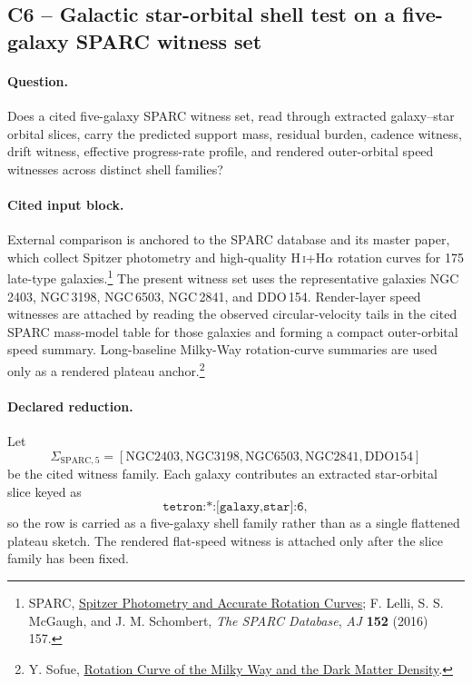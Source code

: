 \subsection{C6 -- Galactic star-orbital shell test on a five-galaxy SPARC witness set}\label{app:c6}
\paragraph{Question.} Does a cited five-galaxy SPARC witness set, read through extracted galaxy--star orbital slices, carry the predicted support mass, residual burden, cadence witness, drift witness, effective progress-rate profile, and rendered outer-orbital speed witnesses across distinct shell families?

\paragraph{Cited input block.} External comparison is anchored to the SPARC database and its master paper, which collect Spitzer photometry and high-quality H\,\textsc{i}+H$\alpha$ rotation curves for 175 late-type galaxies.\footnote{SPARC, \href{https://astroweb.case.edu/SPARC/}{Spitzer Photometry and Accurate Rotation Curves}; F. Lelli, S. S. McGaugh, and J. M. Schombert, \emph{The SPARC Database}, \emph{AJ} \textbf{152} (2016) 157.} The present witness set uses the representative galaxies NGC\,2403, NGC\,3198, NGC\,6503, NGC\,2841, and DDO\,154. Render-layer speed witnesses are attached by reading the observed circular-velocity tails in the cited SPARC mass-model table for those galaxies and forming a compact outer-orbital speed summary. Long-baseline Milky-Way rotation-curve summaries are used only as a rendered plateau anchor.\footnote{Y. Sofue, \href{https://www.ioa.s.u-tokyo.ac.jp/~sofue/papers/sofcomp/2020-galax-RC-DM-MW-Review.pdf}{Rotation Curve of the Milky Way and the Dark Matter Density}.}

\paragraph{Declared reduction.} Let
\[
\Sigma_{\mathrm{SPARC},5} = [\mathrm{NGC2403},\mathrm{NGC3198},\mathrm{NGC6503},\mathrm{NGC2841},\mathrm{DDO154}]
\]
be the cited witness family. Each galaxy contributes an extracted star-orbital slice keyed as
\[
\texttt{tetron:*:[galaxy,star]:6},
\]
so the row is carried as a five-galaxy shell family rather than as a single flattened plateau sketch. The rendered flat-speed witness is attached only after the slice family has been fixed.

